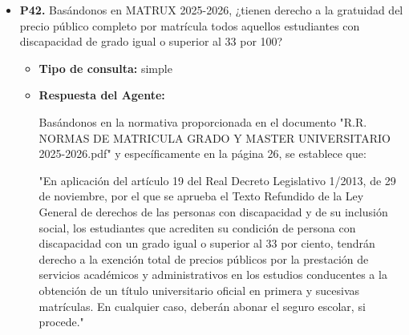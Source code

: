 \documentclass{article}
\begin{document}
\begin{itemize}
\begin{itemize}
                        Según las normas de evaluación de la Universidad de Sevilla, específicamente en el artículo 20.3 de las Normas de Matrícula Grado y Master Universitario 2025-2026, se establece que "No se computarán las convocatorias en las que el estudiante figure en acta con la mención de “No Presentado”".

                        Por lo tanto, si no te presentas físicamente a la primera convocatoria ordinaria del primer cuatrimestre, no se consumirá ninguna convocatoria a efectos de las normas de permanencia, ya que no figurarás en acta con una calificación, sino con la mención de "No Presentado".

                        Es importante tener en cuenta que, según el artículo 22.2 de la misma normativa, los estudiantes que se matriculen por primera vez en una asignatura solo podrán presentarse a las dos convocatorias posteriores a la finalización del periodo lectivo de la misma. Sin embargo, en este caso, no se consume ninguna convocatoria al no presentarte a la primera convocatoria.

                        En resumen, no consumirás ninguna convocatoria a efectos de las normas de permanencia si no te presentas a la primera convocatoria ordinaria del primer cuatrimestre, siempre y cuando no figure en acta con una calificación.
                  \item \textbf{Contexto utilizado:}

            \end{itemize}

      \item \textbf{P42.} Basándonos en MATRUX 2025-2026, ¿tienen derecho a la gratuidad del precio público completo por matrícula todos aquellos estudiantes con discapacidad de grado igual o superior al 33 por 100? \\
            \begin{itemize}
                  \item \textbf{Tipo de consulta:} simple
                  \item \textbf{Respuesta del Agente:}

                        Basándonos en la normativa proporcionada en el documento "R.R. NORMAS DE MATRICULA GRADO Y MASTER UNIVERSITARIO 2025-2026.pdf" y específicamente en la página 26, se establece que:

                        "En aplicación del artículo 19 del Real Decreto Legislativo 1/2013, de 29 de noviembre, por el que se aprueba el Texto Refundido de la Ley General de derechos de las personas con discapacidad y de su inclusión social, los estudiantes que acrediten su condición de persona con discapacidad con un grado igual o superior al 33 por ciento, tendrán derecho a la exención total de precios públicos por la prestación de servicios académicos y administrativos en los estudios conducentes a la obtención de un título universitario oficial en primera y sucesivas matrículas. En cualquier caso, deberán abonar el seguro escolar, si procede."


\end{itemize}
\end{itemize}
\end{document}
